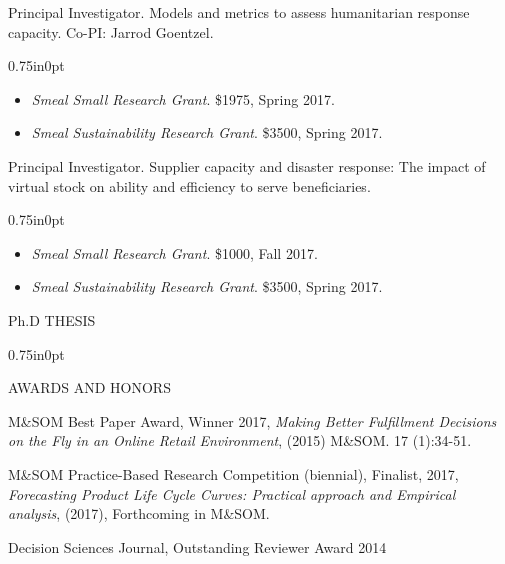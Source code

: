 \documentclass[letterpaper,11pt,oneside]{article}
\newcommand\myIndent{0.75in}
\newcommand\myParSkip{3pt}
\newcommand\myHangIndent{1in}
\newcommand\mySpaceBeforeSection{0.9em}
\newcommand\myNegSpaceCorrectBib{-4.25em}
\newcommand\mySpaceBeforeSectionAfterBib{0em}
\newcommand{\NiceIndent}{ \parindent=\myIndent \hangindent=\myHangIndent }
\newenvironment{miniListBullet}
    {
        \begin{adjustwidth}{\myIndent}{0pt}
        \setlength{\parskip}{0pt}%
        \renewcommand\labelitemi{{\boldmath$\cdot$}}
        \begin{itemize}
        \setlength\itemsep{0em}
    }
    {
        \end{itemize}
        \setlength{\parskip}{\myParSkip}%
        \end{adjustwidth}
    }
\begin{document}
\NiceIndent Principal Investigator.  Models and metrics to assess humanitarian response capacity.   Co-PI: Jarrod Goentzel.
\begin{miniListBullet}
    \item \textit{Smeal Small Research Grant}.  \$1975, Spring 2017.
    \item \textit{Smeal Sustainability Research Grant}.  \$3500, Spring 2017.
\end{miniListBullet}

\NiceIndent Principal Investigator.  Supplier capacity and disaster response: The impact of virtual stock on ability and efficiency to serve beneficiaries. 
\begin{miniListBullet}
    \item \textit{Smeal Small Research Grant}.  \$1000, Fall 2017.
    \item \textit{Smeal Sustainability Research Grant}.  \$3500, Spring 2017.
\end{miniListBullet}

\vspace{\mySpaceBeforeSection}

\noindent Ph.D THESIS
\vspace{\myNegSpaceCorrectBib}
\begin{bibunit}
    \begin{adjustwidth}{\myIndent}{0pt}
        
        \nocite{acimovic_lowering_2012}
        
        \putbib
    \end{adjustwidth}
\end{bibunit}

\vspace{\mySpaceBeforeSectionAfterBib}

\noindent AWARDS AND HONORS

\NiceIndent M\&SOM Best Paper Award, Winner 2017, \textit{Making Better Fulfillment Decisions on the Fly in an Online Retail Environment}, (2015) M\&SOM. 17 (1):34-51.

\NiceIndent M\&SOM Practice-Based Research Competition (biennial), Finalist, 2017, \textit{Forecasting Product Life Cycle Curves: Practical approach and Empirical analysis}, (2017), Forthcoming in M\&SOM.

\NiceIndent Decision Sciences Journal, Outstanding Reviewer Award 2014
\end{document}
